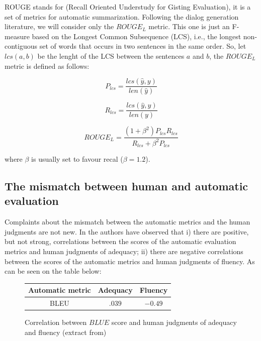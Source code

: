 ROUGE stands for (Recall Oriented Understudy for Gisting Evaluation), it is a set of metrics for automatic summarization\cite{Lin}. Following the dialog generation literature\cite{Lowe:2016}, we will consider only the $ROUGE_L$ metric. This one is just an F-measure based on the Longest Common Subsequence (LCS), i.e., the longest non-contiguous set of words that occurs in two sentences in the same order. So, let $lcs(a,b)$ be the lenght of the LCS between the sentences $a$ and $b$, the $ROUGE_L$ metric is defined as follows: 

\begin{equation}
P_{lcs} = \frac{lcs(\hat{y}, y)}{len(\hat{y})}
\end{equation}    


\begin{equation}
R_{lcs} = \frac{lcs(\hat{y}, y)}{len(y)}
\end{equation}

\begin{equation}
ROUGE_L = \frac{(1 + \beta^2) P_{lcs} R_{lcs}}{R_{lcs} + \beta^{2}P_{lcs}}
\end{equation}

where $\beta$ is usually set to favour recal ($\beta = 1.2$).

\subsection{The mismatch between human and automatic evaluation}

Complaints about the mismatch between the automatic metrics and the human judgments are not new. In  \cite{Stent} the authors have observed that i) there  are  positive,  but  not  strong,  correlations  between  the  scores  of the automatic evaluation metrics and human judgments of adequacy; ii) there are negative correlations between the scores of the automatic metrics and human judgments of fluency. As can be seen on the table below:

\begin{figure}[h]
\label{stenttable}
\begin{center}
\begin{tabular}{|c|c|c|}
\hline
\cellcolor{blue!10} Automatic metric & \cellcolor{blue!10} Adequacy & \cellcolor{blue!10} Fluency \\ \hline
BLEU & $.039$ & $-0.49$ \\ \hline
\end{tabular}
\end{center}
\caption{Correlation between $BLUE$ score and human judgments of adequacy and fluency (extract from\cite{Stent})}
\end{figure}

